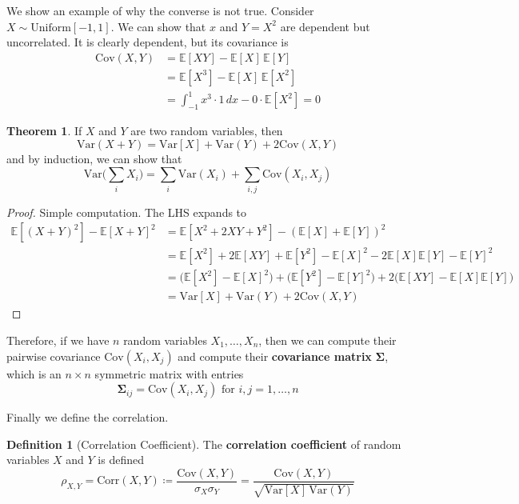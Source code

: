 \documentclass{article}
\theoremstyle{definition}
\newtheorem{theorem}{Theorem}[section]
\theoremstyle{remark}
\theoremstyle{definition}
\newtheorem{definition}{Definition}[section]
\begin{document}
We show an example of why the converse is not true. Consider $X \sim \mathrm{Uniform}[-1, 1]$. We can show that $x$ and $Y = X^2$ are dependent but uncorrelated. It is clearly dependent, but its covariance is 
\begin{align*}
    \mathrm{Cov}(X, Y) & = \mathbb{E}[X Y] - \mathbb{E}[X] \, \mathbb{E}[Y] \\
    & = \mathbb{E}[X^3] - \mathbb{E}[X] \, \mathbb{E}[X^2] \\
    & = \int_{-1}^1 x^3 \cdot 1 \,dx - 0 \cdot \mathbb{E}[X^2] = 0
\end{align*}

\begin{theorem}
If $X$ and $Y$ are two random variables, then 
\[\mathrm{Var}(X + Y) = \mathrm{Var}[X] + \mathrm{Var}(Y) + 2 \mathrm{Cov}(X, Y)\]
and by induction, we can show that 
\[\mathrm{Var}\bigg( \sum_i X_i\bigg) = \sum_{i} \mathrm{Var}(X_i) + \sum_{i, j} \mathrm{Cov}(X_i, X_j) \]
\end{theorem}
\begin{proof}
Simple computation. The LHS expands to 
\begin{align*}
    \mathbb{E}[(X + Y)^2] - \mathbb{E}[X + Y]^2 & = \mathbb{E}[X^2 + 2XY + Y^2] - (\mathbb{E}[X] + \mathbb{E}[Y])^2 \\
    & = \mathbb{E}[X^2] + 2 \mathbb{E}[XY] + \mathbb{E}[Y^2] - \mathbb{E}[X]^2 - 2 \mathbb{E}[X] \mathbb{E}[Y] - \mathbb{E}[Y]^2 \\
    & = \big( \mathbb{E}[X^2] - \mathbb{E}[X]^2 \big) + \big( \mathbb{E}[Y^2] - \mathbb{E}[Y]^2 \big) + 2 \big( \mathbb{E}[XY] - \mathbb{E}[X] \mathbb{E}[Y] \big) \\
    & = \mathrm{Var}[X] + \mathrm{Var}(Y) + 2 \mathrm{Cov}(X, Y) 
\end{align*}
\end{proof}

Therefore, if we have $n$ random variables $X_1, \ldots, X_n$, then we can compute their pairwise covariance $\mathrm{Cov}(X_i, X_j)$ and compute their \textbf{covariance matrix} $\boldsymbol{\Sigma}$, which is an $n \times n$ symmetric matrix with entries 
\[\boldsymbol{\Sigma}_{ij} = \mathrm{Cov}(X_i, X_j) \text{ for } i, j = 1, \ldots, n\]

Finally we define the correlation. 

\begin{definition}[Correlation Coefficient]
The \textbf{correlation coefficient} of random variables $X$ and $Y$ is defined 
\[\rho_{X, Y} = \mathrm{Corr}(X, Y) \coloneqq \frac{\mathrm{Cov}(X, Y)}{\sigma_X \sigma_Y} = \frac{\mathrm{Cov}(X, Y)}{\sqrt{\mathrm{Var}[X] \, \mathrm{Var}(Y)}}\]
\end{definition}
\end{document}
